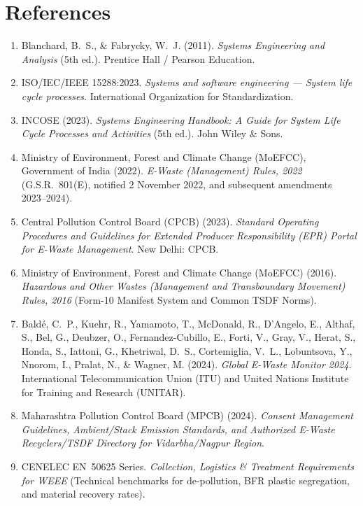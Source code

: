 \newpage
\section*{References}

\begingroup
\small
\begin{enumerate}[leftmargin=1.8em, itemsep=3pt]
    \item Blanchard, B.~S., \& Fabrycky, W.~J. (2011). \textit{Systems Engineering and Analysis} (5th ed.). Prentice Hall / Pearson Education.
    \item ISO/IEC/IEEE 15288:2023. \textit{Systems and software engineering --- System life cycle processes}. International Organization for Standardization.
    \item INCOSE (2023). \textit{Systems Engineering Handbook: A Guide for System Life Cycle Processes and Activities} (5th ed.). John Wiley \& Sons.
    \item Ministry of Environment, Forest and Climate Change (MoEFCC), Government of India (2022). \textit{E-Waste (Management) Rules, 2022} (G.S.R.~801(E), notified 2 November 2022, and subsequent amendments 2023--2024).
    \item Central Pollution Control Board (CPCB) (2023). \textit{Standard Operating Procedures and Guidelines for Extended Producer Responsibility (EPR) Portal for E-Waste Management}. New Delhi: CPCB.
    \item Ministry of Environment, Forest and Climate Change (MoEFCC) (2016). \textit{Hazardous and Other Wastes (Management and Transboundary Movement) Rules, 2016} (Form-10 Manifest System and Common TSDF Norms).
    \item Bald\'e, C.~P., Kuehr, R., Yamamoto, T., McDonald, R., D'Angelo, E., Althaf, S., Bel, G., Deubzer, O., Fernandez-Cubillo, E., Forti, V., Gray, V., Herat, S., Honda, S., Iattoni, G., Khetriwal, D.~S., Cortemiglia, V.~L., Lobuntsova, Y., Nnorom, I., Pralat, N., \& Wagner, M. (2024). \textit{Global E-Waste Monitor 2024}. International Telecommunication Union (ITU) and United Nations Institute for Training and Research (UNITAR).
    \item Maharashtra Pollution Control Board (MPCB) (2024). \textit{Consent Management Guidelines, Ambient/Stack Emission Standards, and Authorized E-Waste Recyclers/TSDF Directory for Vidarbha/Nagpur Region}.
    \item CENELEC EN~50625 Series. \textit{Collection, Logistics \& Treatment Requirements for WEEE} (Technical benchmarks for de-pollution, BFR plastic segregation, and material recovery rates).
\end{enumerate}
\endgroup

